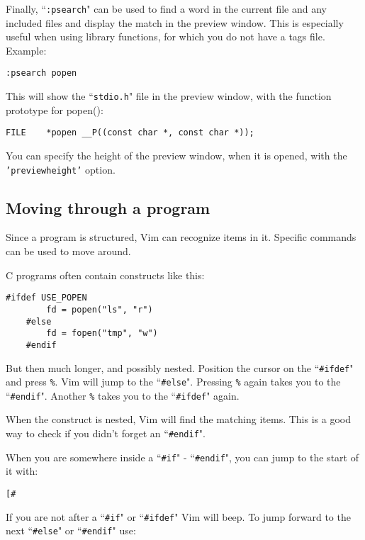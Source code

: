 Finally, ``\texttt{:psearch}" can be used to find a word in the current file and any included files and display the match in the preview window.
This is especially useful when using library functions, for which you do not have a tags file.
Example:

\begin{Verbatim}[samepage=true]
 :psearch popen
\end{Verbatim}

This will show the ``\texttt{stdio.h}" file in the preview window, with the function prototype for popen():

\begin{Verbatim}[samepage=true]
    FILE    *popen __P((const char *, const char *)); 
\end{Verbatim}

You can specify the height of the preview window, when it is opened, with the \texttt{'previewheight'} option.
\subsection{Moving through a program}
Since a program is structured, Vim can recognize items in it.
Specific commands can be used to move around.

C programs often contain constructs like this:

\begin{Verbatim}[samepage=true]
    #ifdef USE_POPEN 
        fd = popen("ls", "r") 
    #else 
        fd = fopen("tmp", "w") 
    #endif 
\end{Verbatim}

But then much longer, and possibly nested.
Position the cursor on the ``\texttt{\#ifdef}" and press \texttt{\%}.
Vim will jump to the ``\texttt{\#else}".
Pressing \texttt{\%} again takes you to the ``\texttt{\#endif}".
Another \texttt{\%} takes you to the ``\texttt{\#ifdef}" again.

When the construct is nested, Vim will find the matching items.
This is a good way to check if you didn't forget an ``\texttt{\#endif}".

When you are somewhere inside a ``\texttt{\#if}" - ``\texttt{\#endif}", you can jump to the start of it with:

\begin{Verbatim}[samepage=true]
 [#
\end{Verbatim}

If you are not after a ``\texttt{\#if}" or ``\texttt{\#ifdef}" Vim will beep.
To jump forward to the next ``\texttt{\#else}" or ``\texttt{\#endif}" use:

